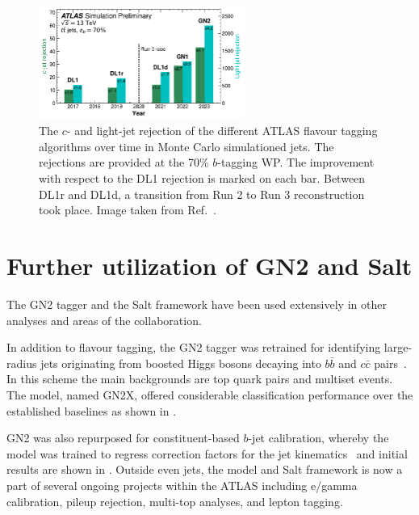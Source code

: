 \begin{figure}
    \centering
    \includegraphics[width=0.6\textwidth]{figures/flavour_tagging/year_improvement.pdf}
    \caption{The $c$- and light-jet rejection of the different ATLAS flavour tagging algorithms over time in Monte Carlo simulationed jets. The rejections are provided at the 70\% $b$-tagging WP. The improvement with respect to the DL1 rejection is marked on each bar. Between DL1r and DL1d, a transition from Run 2 to Run 3 reconstruction took place. Image taken from Ref.~\cite{GN2Plots}.}
    \label{fig:ftag_better}
\end{figure}

\section{Further utilization of GN2 and Salt}

The GN2 tagger and the Salt framework have been used extensively in other analyses and areas of the collaboration.

In addition to flavour tagging, the GN2 tagger was retrained for identifying large-radius jets originating from boosted Higgs bosons decaying into $b\bar{b}$ and $c\bar{c}$ pairs~\cite{GN2X}.
In this scheme the main backgrounds are top quark pairs and multiset events.
The model, named GN2X, offered considerable classification performance over the established baselines as shown in .

GN2 was also repurposed for constituent-based $b$-jet calibration, whereby the model was trained to regress correction factors for the jet kinematics~\cite{GN2Calib} and initial results are shown in .
Outside even jets, the model and Salt framework is now a part of several ongoing projects within the ATLAS including e/gamma calibration, pileup rejection, multi-top analyses, and lepton tagging.

